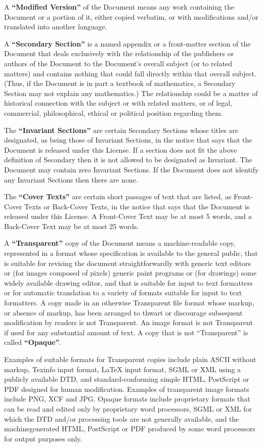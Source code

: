 A \textbf{``Modified Version''} of the Document means any work containing the Document or
a portion of it, either copied verbatim, or with modifications and/or translated into another
language.

A \textbf{``Secondary Section''} is a named appendix or a front-matter section of the Document
that deals exclusively with the relationship of the publishers or authors of the Document to
the Document’s overall subject (or to related matters) and contains nothing that could fall
directly within that overall subject. (Thus, if the Document is in part a textbook of mathematics,
a Secondary Section may not explain any mathematics.) The relationship could be a
matter of historical connection with the subject or with related matters, or of legal, commercial,
philosophical, ethical or political position regarding them.

The \textbf{``Invariant Sections''} are certain Secondary Sections whose titles are designated, as
being those of Invariant Sections, in the notice that says that the Document is released under
this License. If a section does not fit the above definition of Secondary then it is not allowed to be
designated as Invariant. The Document may contain zero Invariant Sections. If the Document
does not identify any Invariant Sections then there are none.

The \textbf{``Cover Texts''} are certain short passages of text that are listed,
as Front-Cover Texts or Back-Cover Texts,
in the notice that says that the Document is released under this License.
A Front-Cover Text may be at most 5 words, and a Back-Cover Text may be at most 25 words.

A \textbf{``Transparent''} copy of the Document means a machine-readable copy, represented in
a format whose specification is available to the general public, that is suitable for revising the
document straightforwardly with generic text editors or (for images composed of pixels) generic
paint programs or (for drawings) some widely available drawing editor, and that is suitable for
input to text formatters or for automatic translation to a variety of formats suitable for input to
text formatters. A copy made in an otherwise Transparent file format whose markup, or absence
of markup, has been arranged to thwart or discourage subsequent modification by readers is not
Transparent. An image format is not Transparent if used for any substantial amount of text. A
copy that is not ``Transparent'' is called \textbf{``Opaque''}.

Examples of suitable formats for Transparent copies include plain ASCII without markup,
Texinfo input format, LaTeX input format, SGML or XML using a publicly available DTD,
and standard-conforming simple HTML, PostScript or PDF designed for human modification.
Examples of transparent image formats include PNG, XCF and JPG. Opaque formats include
proprietary formats that can be read and edited only by proprietary word processors, SGML or
XML for which the DTD and/or processing tools are not generally available, and the
machinegenerated HTML, PostScript or PDF produced by some word processors for output purposes
only.

